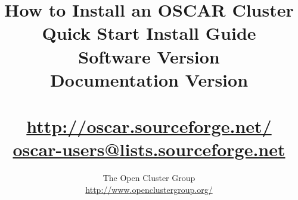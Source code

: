 %
%
%

\title{How to Install an OSCAR Cluster \\
Quick Start Install Guide \\
Software Version \oscarversion \\
Documentation Version \docsversion \\
\ \\
\url{http://oscar.sourceforge.net/} \\
\href{mailto:oscar-users@lists.sourceforge.net}{oscar-users@lists.sourceforge.net}}

\author{The Open Cluster Group \\
\url{http://www.openclustergroup.org/}}
\maketitle
